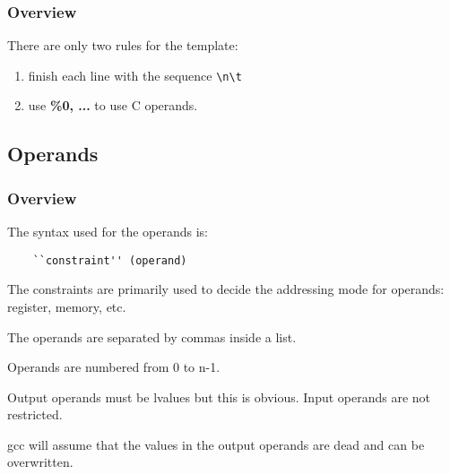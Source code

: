 
\begin{frame}[containsverbatim]
  \frametitle{Overview}

  There are only two rules for the template:

  \begin{enumerate}[<+->]
    \item
      finish each line with the sequence \verb|\n\t|
    \item
      use \textbf{\%0, ...} to use C operands.
  \end{enumerate}
\end{frame}

%
%

\subsection{Operands}


\begin{frame}[containsverbatim]
  \frametitle{Overview}

  The syntax used for the operands is:

  \begin{verbatim}
    ``constraint'' (operand)
  \end{verbatim}

  The constraints are primarily used to decide the addressing mode for
  operands: register, memory, etc.

  \-

  The operands are separated by commas inside a list.

  \-

  Operands are numbered from 0 to n-1.

  \-

  Output operands must be lvalues but this is obvious. Input operands
  are not restricted.

  \-

  gcc will assume that the values in the output operands are dead
  and can be overwritten.
\end{frame}


